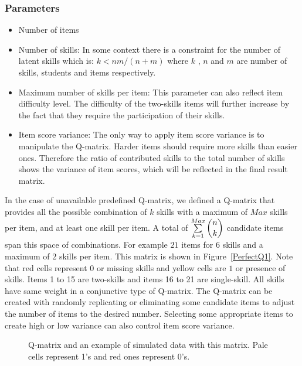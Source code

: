 \subsubsection{Parameters}
\begin{itemize}
\item Number of items 
\item Number of skills: In some context there is a constraint for the number of latent skills which is: $k<nm/(n+m)$ \protect\citep{lee1999learning} where $k$ , $n$ and $m$ are number of skills, students and items respectively.
\item Maximum number of skills per item: This parameter can also reflect item difficulty level. The difficulty of the two-skills items will further increase by the fact that they require the participation of their skills.
\item Item score variance: The only way to apply item score variance is to manipulate the Q-matrix. Harder items should require more skills than easier ones. Therefore the ratio of contributed skills to the total number of skills shows the variance of item scores, which will be reflected in the final result matrix.
\end{itemize}



In the case of unavailable predefined Q-matrix, we defined a Q-matrix that provides all the possible combination of $k$ skills with a maximum of $Max$ skills per item, and at least one skill per item. A total of $\sum\limits_{k=1}^{Max} \dbinom{n}{k}$ candidate items span this space of combinations. For example $21$ items for $6$ skills and a maximum of $2$ skills per item. This matrix is shown in Figure~\ref{PerfectQ1}. Note that red cells represent $0$ or missing skills and yellow cells are $1$ or presence of skills. Items 1 to 15 are two-skills and items 16 to 21 are single-skill. All skills have same weight in a conjunctive type of Q-matrix. The Q-matrix can be created with randomly replicating or eliminating some candidate items to adjust the number of items to the desired number. Selecting some appropriate items to create high or low variance can also control item score variance.

\begin{figure}[ht]
\centering

\quad
\caption{Q-matrix and an example of simulated data with this matrix. Pale cells represent 1's and red ones represent 0's.}
\label{figqmatrixandResutM}
\end{figure}



